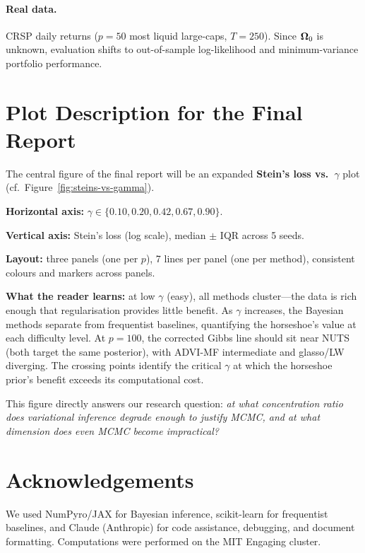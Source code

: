 \documentclass[10pt,conference,compsoc]{IEEEtran}
\begin{document}
\paragraph{Real data.} CRSP daily returns ($p{=}50$ most liquid large-caps, $T{=}250$). Since $\bm{\Omega}_0$ is unknown, evaluation shifts to out-of-sample log-likelihood and minimum-variance portfolio performance.

\section{Plot Description for the Final Report}

The central figure of the final report will be an expanded \textbf{Stein's loss vs.\ $\gamma$} plot (cf.\ Figure~\ref{fig:steins-vs-gamma}).

\textbf{Horizontal axis:} $\gamma\in \{0.10, 0.20, 0.42, 0.67, 0.90\}$.

\textbf{Vertical axis:} Stein's loss (log scale), median $\pm$ IQR across 5 seeds.

\textbf{Layout:} three panels (one per $p$), 7 lines per panel (one per method), consistent colours and markers across panels.

\textbf{What the reader learns:} at low $\gamma$ (easy), all methods cluster---the data is rich enough that regularisation provides little benefit. As $\gamma$ increases, the Bayesian methods separate from frequentist baselines, quantifying the horseshoe's value at each difficulty level. At $p{=}100$, the corrected Gibbs line should sit near NUTS (both target the same posterior), with ADVI-MF intermediate and glasso/LW diverging. The crossing points identify the critical $\gamma$ at which the horseshoe prior's benefit exceeds its computational cost.

This figure directly answers our research question: \emph{at what concentration ratio does variational inference degrade enough to justify MCMC, and at what dimension does even MCMC become impractical?}

\section*{Acknowledgements}
We used NumPyro/JAX for Bayesian inference, scikit-learn for frequentist baselines, and Claude (Anthropic) for code assistance, debugging, and document formatting. Computations were performed on the MIT Engaging cluster.
\end{document}
